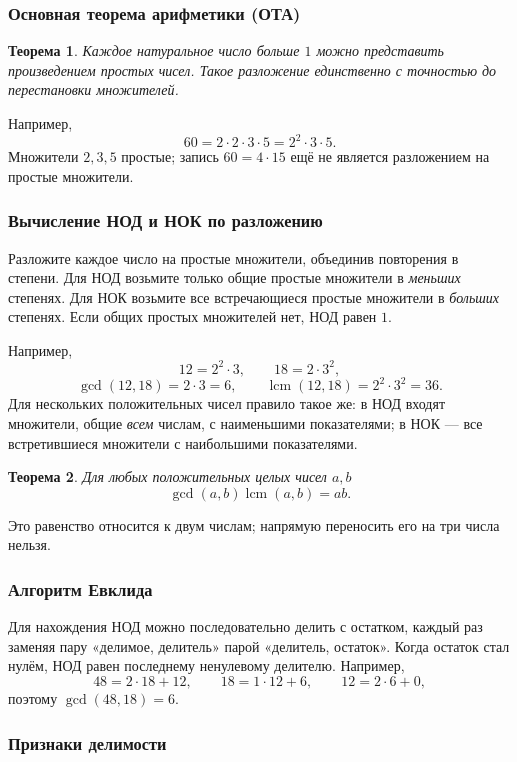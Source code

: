 \documentclass[12pt,a4paper]{article}
\theoremstyle{definition}
\theoremstyle{plain}
\newtheorem{theorem}{Теорема}[section]
\theoremstyle{remark}
\begin{document}
\subsubsection*{Основная теорема арифметики (ОТА)}

\begin{theorem}
Каждое натуральное число больше \(1\) можно представить произведением простых чисел.
Такое разложение единственно с точностью до перестановки множителей.
\end{theorem}

Например,
\[
60=2\cdot2\cdot3\cdot5=2^2\cdot3\cdot5.
\]
Множители \(2,3,5\) простые; запись \(60=4\cdot15\) ещё не является разложением на простые множители.

\subsubsection*{Вычисление НОД и НОК по разложению}

Разложите каждое число на простые множители, объединив повторения в степени.
Для НОД возьмите только общие простые множители в \emph{меньших} степенях.
Для НОК возьмите все встречающиеся простые множители в \emph{больших} степенях.
Если общих простых множителей нет, НОД равен \(1\).

Например,
\[
12=2^2\cdot3,\qquad18=2\cdot3^2,
\]
\[
\gcd(12,18)=2\cdot3=6,\qquad
\operatorname{lcm}(12,18)=2^2\cdot3^2=36.
\]
Для нескольких положительных чисел правило такое же:
в НОД входят множители, общие \emph{всем} числам, с наименьшими показателями;
в НОК --- все встретившиеся множители с наибольшими показателями.

\begin{theorem}
Для любых положительных целых чисел \(a,b\)
\[
\gcd(a,b)\operatorname{lcm}(a,b)=ab.
\]
\end{theorem}
Это равенство относится к двум числам; напрямую переносить его на три числа нельзя.

\subsubsection*{Алгоритм Евклида}

Для нахождения НОД можно последовательно делить с остатком,
каждый раз заменяя пару «делимое, делитель» парой «делитель, остаток».
Когда остаток стал нулём, НОД равен последнему ненулевому делителю.
Например,
\[
48=2\cdot18+12,\qquad
18=1\cdot12+6,\qquad
12=2\cdot6+0,
\]
поэтому \(\gcd(48,18)=6\).

\subsubsection*{Признаки делимости}
\end{document}
